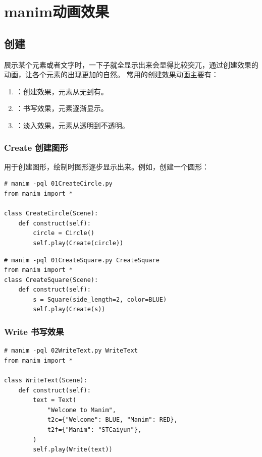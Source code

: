 \chapter{manim动画效果}
\label{cha:manim_animation}

\section{创建}
\label{sec:manim_animation_create}
展示某个元素或者文字时，一下子就全显示出来会显得比较突兀，通过创建效果的动画，让各个元素的出现更加的自然。 常用的创建效果动画主要有：
\begin{enumerate}[label=\arabic*)]
    \item {}：创建效果，元素从无到有。
    \item {}：书写效果，元素逐渐显示。
    \item {}：淡入效果，元素从透明到不透明。
\end{enumerate}

\subsection{Create 创建图形}
\label{subsubsec:manim_animation_create_create}
 用于创建图形，绘制时图形逐步显示出来。例如，创建一个圆形：
\begin{lstlisting}[style=pythonstyle]
# manim -pql 01CreateCircle.py
from manim import *

class CreateCircle(Scene):
    def construct(self):
        circle = Circle()
        self.play(Create(circle))
\end{lstlisting}

\begin{lstlisting}[style=pythonstyle]
# manim -pql 01CreateSquare.py CreateSquare
from manim import *
class CreateSquare(Scene):
    def construct(self):
        s = Square(side_length=2, color=BLUE)
        self.play(Create(s))
\end{lstlisting}

\subsection{Write 书写效果}
\label{subsubsec:manim_animation_create_write}
\begin{lstlisting}[style=pythonstyle]
# manim -pql 02WriteText.py WriteText
from manim import *

class WriteText(Scene):
    def construct(self):
        text = Text(
            "Welcome to Manim",
            t2c={"Welcome": BLUE, "Manim": RED},
            t2f={"Manim": "STCaiyun"},
        )
        self.play(Write(text))
\end{lstlisting}    

